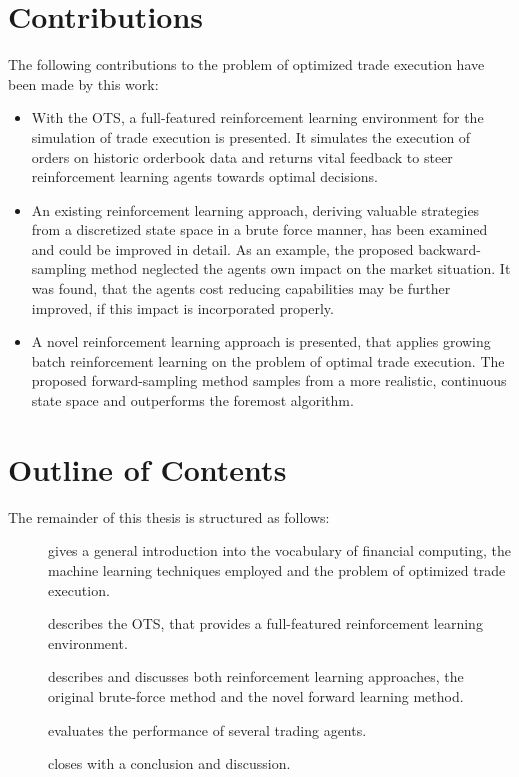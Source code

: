 \section{Contributions}
\label{sec:contributions}
The following contributions to the problem of optimized trade execution have been made by this work:
\begin{itemize}
\item With the \ac{OTS}, a full-featured reinforcement learning environment for the simulation of trade execution is presented. It simulates the execution of orders on historic orderbook data and returns vital feedback to steer reinforcement learning agents towards optimal decisions.

\item An existing reinforcement learning approach, deriving valuable strategies from a discretized state space in a brute force manner, has been examined and could be improved in detail. As an example, the proposed backward-sampling method neglected the agents own impact on the market situation. It was found, that the agents cost reducing capabilities may be further improved, if this impact is incorporated properly.

\item A novel reinforcement learning approach is presented, that applies growing batch reinforcement learning on the problem of optimal trade execution. The proposed forward-sampling method samples from a more realistic, continuous state space and outperforms the foremost algorithm.

\end{itemize}

\section{Outline of Contents}
\label{sec:outline}
The remainder of this thesis is structured as follows:

\begin{description}
\item[] gives a general introduction into the vocabulary of financial computing, the machine learning techniques employed and the problem of optimized trade execution.
\item[] describes the \acl{OTS}, that provides a full-featured reinforcement learning environment.
\item[] describes and discusses both reinforcement learning approaches, \ie the original brute-force method and the novel forward learning method.
\item[] evaluates the performance of several trading agents.
\item[] closes with a conclusion and discussion. 

\end{description}


\cleardoublepage{}